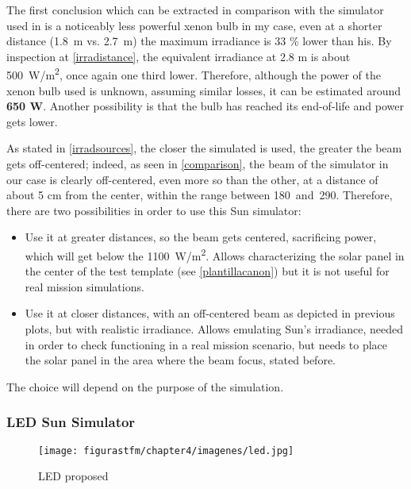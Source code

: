 The first conclusion which can be extracted in comparison with the simulator used in \cite{catalan} is a noticeably less powerful xenon bulb in my case, even at a shorter distance (1.8~m vs. 2.7~m) the maximum irradiance is 33 \% lower than his. By inspection at \autoref{irradistance}, the equivalent irradiance at 2.8 m is about \SI{500}{W/m^2}, once again one third lower. Therefore, although the power of the xenon bulb used is unknown, assuming similar losses, it can be estimated around \textbf{650 W}. Another possibility is that the bulb has reached its end-of-life and power gets lower. 

As stated in \ref{irradsources}, the closer the simulated is used, the greater the beam gets off-centered; indeed, as seen in \autoref{comparison}, the beam of the simulator in our case is clearly off-centered, even more so than the other, at a distance of about 5 cm from the center, within the range between 180\textdegree~and~290\textdegree. Therefore, there are two possibilities in order to use this Sun simulator:
\newpage
\begin{itemize} [noitemsep,topsep=0pt]
\item Use it at greater distances, so the beam gets centered, sacrificing power, which will get below the \SI{1100}{W/m^2}. Allows characterizing the solar panel in the center of the test template (see \autoref{plantillacanon}) but it is not useful for real mission simulations.	\\
\item Use it at closer distances, with an off-centered beam as depicted in previous plots, but with realistic irradiance. Allows emulating Sun's irradiance, needed in order to check functioning in a real mission scenario, but needs to place the solar panel in the area where the beam focus, stated before.
\end{itemize}

The choice will depend on the purpose of the simulation.

\subsubsection{LED Sun Simulator} \label{ledsim}

\begin{wrapfigure}{r}{0.28\textwidth} 
	\centering
	\texttt{[image: figurastfm/chapter4/imagenes/led.jpg]}
	\vspace{0.1cm}
	\caption{\acrshort{LED} proposed} \label{ledchino}
\end{wrapfigure}


